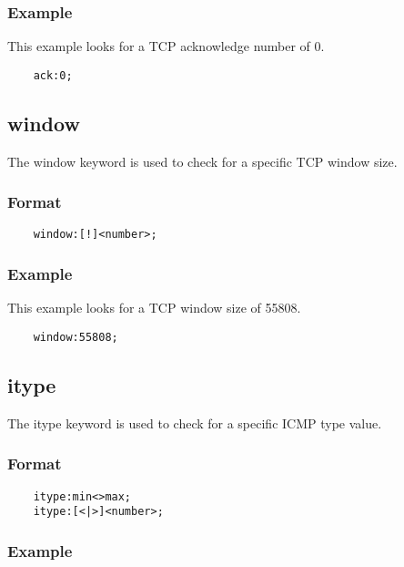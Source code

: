\documentclass[english]{report}
\begin{document}
\subsubsection{Example}

This example looks for a TCP acknowledge number of 0.

\begin{verbatim}
    ack:0;
\end{verbatim}

\subsection{window}

The window keyword is used to check for a specific TCP window size.

\subsubsection{Format}

\begin{verbatim}
    window:[!]<number>;
\end{verbatim}

\subsubsection{Example}

This example looks for a TCP window size of 55808.

\begin{verbatim}
    window:55808;
\end{verbatim}

\subsection{itype}

The itype keyword is used to check for a specific ICMP type value.

\subsubsection{Format}

\begin{verbatim}
    itype:min<>max;
    itype:[<|>]<number>;
\end{verbatim}

\subsubsection{Example}
\end{document}
